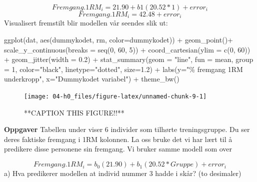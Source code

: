 \documentclass[
]{book}
\newenvironment{Shaded}{\begin{snugshade}}{\end{snugshade}}
\newcommand{\AttributeTok}[1]{\textcolor[rgb]{0.77,0.63,0.00}{#1}}
\newcommand{\DecValTok}[1]{\textcolor[rgb]{0.00,0.00,0.81}{#1}}
\newcommand{\FloatTok}[1]{\textcolor[rgb]{0.00,0.00,0.81}{#1}}
\newcommand{\FunctionTok}[1]{\textcolor[rgb]{0.00,0.00,0.00}{#1}}
\newcommand{\NormalTok}[1]{#1}
\newcommand{\SpecialCharTok}[1]{\textcolor[rgb]{0.00,0.00,0.00}{#1}}
\newcommand{\StringTok}[1]{\textcolor[rgb]{0.31,0.60,0.02}{#1}}
\begin{document}
\[
Fremgang.1RM_i = 21.90 + b1(20.52*1) + error_i
\]
\[
Fremgang.1RM_i = 42.48 + error_i
\]
Visualisert fremstilt blir modellen vår seendes slik ut:

\begin{Shaded}
\begin{Highlighting}[]
\FunctionTok{ggplot}\NormalTok{(dat, }\FunctionTok{aes}\NormalTok{(dummykodet, rm, }\AttributeTok{color=}\NormalTok{dummykodet)) }\SpecialCharTok{+}
  \FunctionTok{geom\_point}\NormalTok{()}\SpecialCharTok{+}
  \FunctionTok{scale\_y\_continuous}\NormalTok{(}\AttributeTok{breaks =} \FunctionTok{seq}\NormalTok{(}\DecValTok{0}\NormalTok{, }\DecValTok{60}\NormalTok{, }\DecValTok{5}\NormalTok{)) }\SpecialCharTok{+}
  \FunctionTok{coord\_cartesian}\NormalTok{(}\AttributeTok{ylim =} \FunctionTok{c}\NormalTok{(}\DecValTok{0}\NormalTok{, }\DecValTok{60}\NormalTok{)) }\SpecialCharTok{+}
  \FunctionTok{geom\_jitter}\NormalTok{(}\AttributeTok{width =} \FloatTok{0.2}\NormalTok{) }\SpecialCharTok{+} 
  \FunctionTok{stat\_summary}\NormalTok{(}\AttributeTok{geom =} \StringTok{"line"}\NormalTok{, }\AttributeTok{fun =}\NormalTok{ mean, }\AttributeTok{group =} \DecValTok{1}\NormalTok{, }\AttributeTok{color=}\StringTok{"black"}\NormalTok{, }\AttributeTok{linetype=}\StringTok{"dotted"}\NormalTok{, }\AttributeTok{size=}\FloatTok{1.2}\NormalTok{) }\SpecialCharTok{+}
  \FunctionTok{labs}\NormalTok{(}\AttributeTok{y=}\StringTok{"\% fremgang 1RM underkropp"}\NormalTok{, }\AttributeTok{x=}\StringTok{"Dummykodet variabel"}\NormalTok{) }\SpecialCharTok{+}
  \FunctionTok{theme\_bw}\NormalTok{()}
\end{Highlighting}
\end{Shaded}

\begin{figure}

{\centering \texttt{[image: 04-h0\_files/figure-latex/unnamed-chunk-9-1]} 

}

\caption{**CAPTION THIS FIGURE!!**}\label{fig:unnamed-chunk-9}
\end{figure}

\textbf{Oppgaver}
Tabellen under viser 6 individer som tilhørte treningsgruppe. Du ser deres faktiske fremgang i 1RM kolonnen. La oss bruke det vi har lært til å predikere disse personene sin fremgang. Vi bruker samme modell som over

\[
Fremgang.1RM_i = b_0(21.90) + b_1(20.52*Gruppe) + error_i
\]
a) Hva predikerer modellen at individ nummer 3 hadde i skår? (to desimaler)
\end{document}
